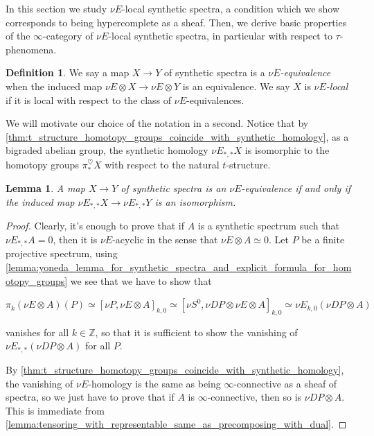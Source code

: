 \documentclass[oneside,a4paper]{amsart}
\theoremstyle{plain}
\newtheorem{lemma}[thm]{Lemma}
\theoremstyle{definition}
\newtheorem{defin}[thm]{Definition}
\theoremstyle{remark}
\begin{document}
In this section we study $\nu E$-local synthetic spectra, a condition which we show corresponds to being hypercomplete as a sheaf. Then, we derive basic properties of the $\infty$-category of $\nu E$-local synthetic spectra, in particular with respect to $\tau$-phenomena.

\begin{defin}
\label{defin:nulocal_synthetic_spectrum}
We say a map $X \rightarrow Y$ of synthetic spectra is a \emph{$\nu E$-equivalence} when the induced map $\nu E \otimes X \rightarrow \nu E \otimes Y$ is an equivalence. We say $X$ is \emph{$\nu E$-local} if it is local with respect to the class of $\nu E$-equivalences.
\end{defin}
We will motivate our choice of the notation in a second. Notice that by \cref{thm:t_structure_homotopy_groups_coincide_with_synthetic_homology}, as a bigraded abelian group, the synthetic homology $\nu E_{*, *}X$ is isomorphic to the homotopy groups $\pi_{*}^{\heartsuit} X$ with respect to the natural $t$-structure. 

\begin{lemma}
\label{lemma:nue_equivalences_detected_by_homotopy_groups}
A map $X \rightarrow Y$ of synthetic spectra is an $\nu E$-equivalence if and only if the induced map $\nu E_{*, *} X \rightarrow \nu E_{*, *} Y$ is an isomorphism.
\end{lemma}

\begin{proof}
Clearly, it's enough to prove that if $A$ is a synthetic spectrum such that $\nu E_{*, *}A = 0$, then it is $\nu E$-acyclic in the sense that $\nu E \otimes A \simeq 0$. Let $P$ be a finite projective spectrum, using \cref{lemma:yoneda_lemma_for_synthetic_spectra_and_explicit_formula_for_homotopy_groups} we see that we have to show that 

\begin{center}
$\pi_{k} (\nu E \otimes A)(P) \simeq [\nu P, \nu E \otimes A]_{k, 0} \simeq [\nu S^{0}, \nu DP \otimes \nu E \otimes A]_{k, 0} \simeq \nu E_{k, 0} (\nu DP \otimes A)$
\end{center}
vanishes for all $k \in \mathbb{Z}$, so that it is sufficient to show the vanishing of $\nu E_{*, *}(\nu DP \otimes A)$ for all $P$.  

By \cref{thm:t_structure_homotopy_groups_coincide_with_synthetic_homology}, the vanishing of $\nu E$-homology is the same as being $\infty$-connective as a sheaf of spectra, so we just have to prove that if $A$ is $\infty$-connective, then so is $\nu DP \otimes A$. This is immediate from \cref{lemma:tensoring_with_representable_same_as_precomposing_with_dual}.
\end{proof}
\end{document}

